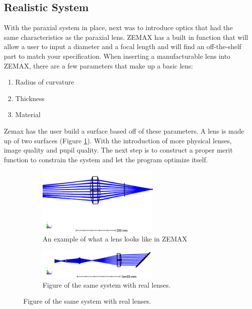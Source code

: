 \subsection{Realistic System}
\label{sec:Optical_real}

With the paraxial system in place, next was to introduce optics that had the same
characteristics as the paraxial lens.  ZEMAX has a built in function that will allow
a user to input a diameter and a focal length and will find an off-the-shelf part to
match your specification.  When inserting a manufacturable lens into ZEMAX, there are a few
parameters that make up a basic lens:

\begin{enumerate}
    \item Radius of curvature
    \item Thickness
    \item Material
\end{enumerate}

Zemax has the user build a surface based off of these parameters.  A lens is made up
of two surfaces (Figure \ref{fig:real_lens}).  With the introduction of more
physical lenses, image quality and pupil quality.  The next step is to construct a
proper merit function to constrain the system and let the program optimize itself.


\begin{figure}[h!]
\centering
\begin{subfigure}{.5\textwidth}
  \centering
  \includegraphics[width=6cm]{Figures/real_lens.png}
  \caption{An example of what a lens looks like in ZEMAX}
  \label{fig:real_lens}
\end{subfigure}%
\begin{subfigure}{.5\textwidth}
  \centering
  \includegraphics[width=6cm]{Figures/real_system_1.png}
  \caption{Figure of the same system with real lenses.}
  \label{fig:lens_system_1}
\end{subfigure}
\label{fig:real_1}
\end{figure}


